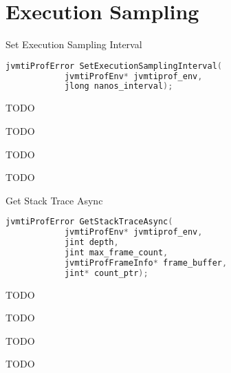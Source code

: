 \section{Execution Sampling}

\begin{apidef}{Set Execution Sampling Interval}
\begin{lstlisting}[language=C]
jvmtiProfError SetExecutionSamplingInterval(
            jvmtiProfEnv* jvmtiprof_env,
            jlong nanos_interval);
\end{lstlisting}

\begin{apidesc}
TODO
\end{apidesc}

\begin{apiphase}
TODO
\end{apiphase}

\begin{apicap}
TODO
\end{apicap}

\begin{apiparam}
\end{apiparam}

\begin{apireturn}
TODO
\end{apireturn}

\begin{apierror}
\end{apierror}
\end{apidef}
\begin{apidef}{Get Stack Trace Async}
\begin{lstlisting}[language=C]
jvmtiProfError GetStackTraceAsync(
            jvmtiProfEnv* jvmtiprof_env,
            jint depth,
            jint max_frame_count,
            jvmtiProfFrameInfo* frame_buffer,
            jint* count_ptr);
\end{lstlisting}

\begin{apidesc}
TODO
\end{apidesc}

\begin{apiphase}
TODO
\end{apiphase}

\begin{apicap}
TODO
\end{apicap}

\begin{apiparam}
\end{apiparam}

\begin{apireturn}
TODO
\end{apireturn}

\begin{apierror}
\end{apierror}
\end{apidef}
